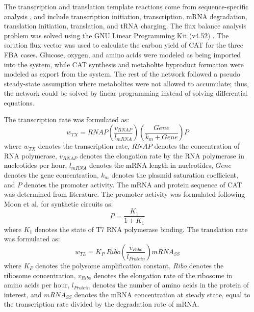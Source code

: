 \documentclass[12pt]{article}
\begin{document}
The transcription and translation template reactions come from sequence-specific analysis \cite{Allen:2003aa}, and include transcription initiation, transcription, mRNA degradation, translation initiation, translation, and tRNA charging.
The flux balance analysis problem was solved using the GNU Linear Programming Kit (v4.52) \cite{GLPK}.
The solution flux vector was used to calculate the carbon yield of CAT for the three FBA cases.
Glucose, oxygen, and amino acids were modeled as being imported into the system, while CAT synthesis and metabolite byproduct formation were modeled as export from the system.
The rest of the network followed a pseudo steady-state assumption where metabolites were not allowed to accumulate; thus, the network could be solved by linear programming instead of solving differential equations.

The transcription rate was formulated as:
\begin{equation}
	w_{TX} = RNAP\left(\frac{v_{RNAP}}{l_{mRNA}}\right)\left(\frac{Gene}{k_m+Gene}\right)P
\end{equation}
where $w_{TX}$ denotes the transcription rate, $RNAP$ denotes the concentration of RNA polymerase, $v_{RNAP}$ denotes the elongation rate by the RNA polymerase in nucleotides per hour, $l_{mRNA}$ denotes the mRNA length in nucleotides, $Gene$ denotes the gene concentration, $k_m$ denotes the plasmid saturation coefficient, and $P$ denotes the promoter activity.
The mRNA and protein sequence of CAT was determined from literature.
The promoter activity was formulated following Moon et al. for synthetic circuits as:
\begin{equation}
	P = \frac{K_{1}}{1 + K_{1}}
\end{equation}
where $K_{1}$ denotes the state of T7 RNA polymerase binding.
The translation rate was formulated as:
 \begin{equation}
	w_{TL} = K_{P}\ Ribo\left(\frac{v_{Ribo}}{l_{Protein}}\right)mRNA_{SS}
\end{equation}
where $K_{P}$ denotes the polysome amplification constant, $Ribo$ denotes the ribosome concentration, $v_{Ribo}$ denotes the elongation rate of the ribosome in amino acids per hour, $l_{Protein}$ denotes the number of amino acids in the protein of interest, and $mRNA_{SS}$ denotes the mRNA concentration at steady state, equal to the transcription rate divided by the degradation rate of mRNA.
\end{document}
